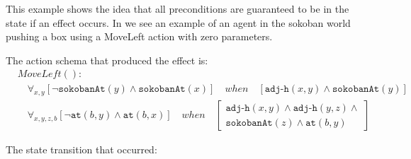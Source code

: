 \documentclass[\master/Master.tex]{subfiles}
\begin{document}
\begin{example}\label{ex:ca:sokoban-moveleft-action}
	This example shows the idea that all preconditions are guaranteed to be in the state if an effect occurs.
 In  we see an example of an agent in the sokoban world pushing a box using a MoveLeft action with zero parameters.
	
	The action schema that produced the effect is:
	\begin{align*}
		&MoveLeft():&  \\
		&\quad
		\forall_{x, y}
		\left[
		\neg\texttt{sokobanAt}(y) \land \texttt{sokobanAt}(x)
		\right]
		\quad when \quad
		\left[ \texttt{adj-h}(x,y) \land \texttt{sokobanAt}(y) \right]& \\
		&\quad
		\forall_{x, y, z, b}
		\left[ \neg\texttt{at}(b,y) \land \texttt{at}(b,x) \right]
		\quad when \quad
		\left[
		\begin{gathered}
			\texttt{adj-h}(x,y) \land \texttt{adj-h}(y,z) \land \\
			\texttt{sokobanAt}(z) \land \texttt{at}(b, y)
		\end{gathered}
		\right] &
	\end{align*}
	
	The state transition that occurred:
	

\end{example}
\end{document}
